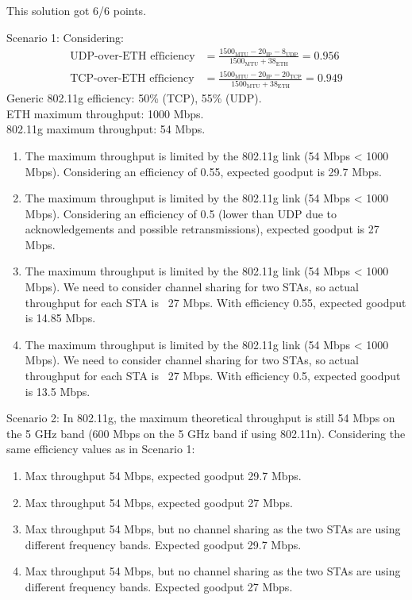 \begin{solution}
    This solution got 6/6 points.

    Scenario 1:
    Considering:
    \begin{align*}
        \text{UDP-over-ETH efficiency} & = \frac{1500_{\text{MTU}} - 20_{\text{IP}} - 8_{\text{UDP}}}{1500_{\text{MTU}} + 38_{\text{ETH}}} = 0.956  \\
        \text{TCP-over-ETH efficiency} & = \frac{1500_{\text{MTU}} - 20_{\text{IP}} - 20_{\text{TCP}}}{1500_{\text{MTU}} + 38_{\text{ETH}}} = 0.949
    \end{align*}
    Generic 802.11g efficiency: 50\% (TCP), 55\% (UDP). \\
    ETH maximum throughput: 1000 Mbps. \\
    802.11g maximum throughput: 54 Mbps.
    \begin{enumerate}
        \item The maximum throughput is limited by the 802.11g link (54 Mbps < 1000 Mbps). Considering an efficiency of 0.55, expected goodput is 29.7 Mbps.
        \item The maximum throughput is limited by the 802.11g link (54 Mbps < 1000 Mbps). Considering an efficiency of 0.5 (lower than UDP due to acknowledgements and possible retransmissions), expected goodput is 27 Mbps.
        \item The maximum throughput is limited by the 802.11g link (54 Mbps < 1000 Mbps). We need to consider channel sharing for two STAs, so actual throughput for each STA is ~27 Mbps. With efficiency 0.55, expected goodput is 14.85 Mbps.
        \item The maximum throughput is limited by the 802.11g link (54 Mbps < 1000 Mbps). We need to consider channel sharing for two STAs, so actual throughput for each STA is ~27 Mbps. With efficiency 0.5, expected goodput is 13.5 Mbps.
    \end{enumerate}

    Scenario 2:
    In 802.11g, the maximum theoretical throughput is still 54 Mbps on the 5 GHz band (600 Mbps on the 5 GHz band if using 802.11n).
    Considering the same efficiency values as in Scenario 1:
    \begin{enumerate}
        \item Max throughput 54 Mbps, expected goodput 29.7 Mbps.
        \item Max throughput 54 Mbps, expected goodput 27 Mbps.
        \item Max throughput 54 Mbps, but no channel sharing as the two STAs are using different frequency bands. Expected goodput 29.7 Mbps.
        \item Max throughput 54 Mbps, but no channel sharing as the two STAs are using different frequency bands. Expected goodput 27 Mbps.
    \end{enumerate}


\end{solution}
